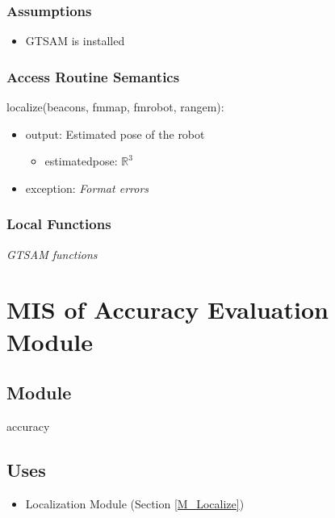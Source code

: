 \documentclass[12pt, titlepage]{article}
\begin{document}
\subsubsection{Assumptions}
\begin{itemize}
  \item GTSAM is installed
\end{itemize}

\subsubsection{Access Routine Semantics}

\noindent localize(beacons, fm\textunderscore map, fm\textunderscore robot, range\textunderscore m):
\begin{itemize}
\item output: Estimated pose of the robot
\begin{itemize}
  \item estimated\textunderscore pose: $\mathbb{R}^3$ 
\end{itemize}
\item exception: \textit{Format errors}
\end{itemize}

\subsubsection{Local Functions}
\textit{GTSAM functions}

\newpage

\section{MIS of Accuracy Evaluation Module} \label{M_Accurate}

\subsection{Module}

accuracy

\subsection{Uses}
\begin{itemize}
  \item Localization Module (Section \ref{M_Localize})
\end{itemize}
\end{document}
